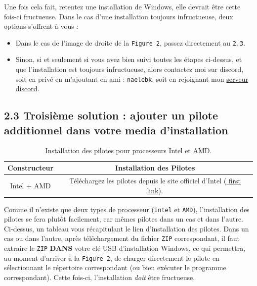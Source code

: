 \documentclass[french, a4paper, 11pt]{article}
\begin{document}
\noindent Une fois cela fait, retentez une installation de Windows, elle devrait être cette fois-ci fructueuse. Dans le cas d'une installation toujours infructueuse, deux options s'offrent à vous : 
\begin{itemize}
\item Dans le cas de l'image de droite de la \texttt{Figure 2}, passez directement au \texttt{2.3}.
\item Sinon, si et seulement si vous avez bien suivi toutes les étapes ci-dessus, et que l'installation est toujours infructueuse, alors contactez moi sur discord, soit en privé en m'ajoutant en ami : \texttt{naelebk}, soit en rejoignant mon \href{https://discord.gg/ja7t6Aq}{\color{blue} serveur discord}.
\end{itemize}
\subsection*{2.3 Troisième solution : ajouter un pilote additionnel dans votre media d'installation}
\begin{table}[ht]
    \centering
    \begin{tabular}{|c|c|}
        \hline
        \textbf{Constructeur} & \textbf{Installation des Pilotes} \\
        \hline
        Intel + AMD & Téléchargez les pilotes depuis le site officiel d'Intel (\href{https://www.intel.fr/content/www/fr/fr/download/771902/intel-rapid-storage-technology-intel-rst-driver-for-windows-10-64-bit-windows-11-for-intel-nuc-11-enthusiast-kit-mini-pc-nuc11phki7.html}{\color{blue} first link}). \\
        \hline
    \end{tabular}
    \caption{Installation des pilotes pour processeurs Intel et AMD.}
    \label{tab:install-pilotes}
\end{table}

\noindent Comme il n'existe que deux types de processeur (\texttt{Intel} et \texttt{AMD}), l'installation des pilotes se fera plutôt facilement, car mêmes pilotes dans un cas et dans l'autre. Ci-dessus, un tableau vous récapitulant le lien d'installation des pilotes. Dans un cas ou dans l'autre, après téléchargement du fichier \texttt{ZIP} correspondant, il faut extraire le \texttt{ZIP} \textbf{DANS} votre clé USB d'installation Windows, ce qui permettra, au moment d'arriver à la \texttt{Figure 2}, de charger directement le pilote en sélectionnant le répertoire correspondant (ou bien exécuter le programme correspondant). Cette fois-ci, l'installation \textit{doit} être fructueuse.
\end{document}
